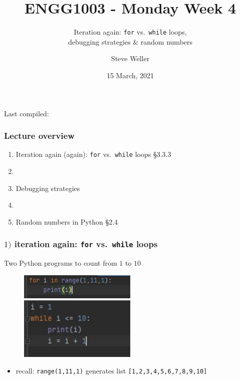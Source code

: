 \documentclass[english,14pt]{beamer}
\title{ENGG1003 - Monday Week 4}
\subtitle{Iteration again: \texttt{for} vs.~\texttt{while} loops, \\ debugging strategies \& random numbers}
\author{Steve Weller}
\institute{University of Newcastle}
\date{15 March, 2021}
\newcommand\red[1]{{\color{red} #1}}
\begin{document}
\begin{flushleft}
{\scriptsize Last compiled:~\DTMnow}
\vspace*{-5mm}
\end{flushleft}
\framebreak


\begin{frame}[fragile]

\frametitle{Lecture overview}
\begin{enumerate}
	\item Iteration again (again): \texttt{for} vs.~\texttt{while} loops \red{\S3.3.3}

	\item[]
	
	\item Debugging strategies
	
	\item[]
	
	\item Random numbers in Python \red{\S2.4}

\end{enumerate}

\end{frame}


\begin{frame}[fragile]

\frametitle{$1)$ iteration again: \texttt{for} vs.~\texttt{while} loops}

Two Python programs to count from $1$ to $10$

\begin{figure}[ht]
	\centering
	\includegraphics[width=0.5\textwidth]{figures/for1to10}%
	\hspace*{3mm}\includegraphics[width=0.5\textwidth]{figures/while1to10}
\end{figure}

\begin{itemize}
	\item recall: \texttt{range(1,11,1)} generates list \texttt{[1,2,3,4,5,6,7,8,9,10]} 
\end{itemize}

\end{frame}
\end{document}

